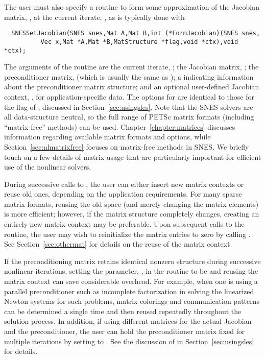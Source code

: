 The user must also specify a routine to form some approximation of the
Jacobian matrix, , at the current iterate, ,
as is typically done with
\begin{verbatim}
  SNESSetJacobian(SNES snes,Mat A,Mat B,int (*FormJacobian)(SNES snes,
          Vec x,Mat *A,Mat *B,MatStructure *flag,void *ctx),void *ctx);
\end{verbatim}
The  arguments of the routine  are the current iterate, ; the Jacobian matrix,
; the preconditioner matrix,  (which is usually the same
as ); a  indicating information about the
preconditioner matrix structure; and an optional user-defined Jacobian
context, , for application-specific data.  The options for
 are identical to those for the flag of , discussed in Section~\ref{sec:usingsles}.  
Note that the SNES solvers are all data-structure neutral, so the full
range of PETSc matrix formats (including ``matrix-free''
methods) can be used.  Chapter~\ref{chapter:matrices} discusses
information regarding available matrix formats and options, while
Section~\ref{sec:nlmatrixfree} focuses on matrix-free
methods in SNES. We briefly touch on a few details of matrix usage that are
particularly important for efficient use of the nonlinear solvers.

During successive calls to , the user can either
insert new matrix contexts or reuse old ones, depending on the
application requirements. For many sparse matrix formats, reusing the
old space (and merely changing the matrix elements) is more efficient;
however, if the matrix structure completely changes, creating an
entirely new matrix context may be preferable.  
Upon subsequent calls to the 
 routine, the user may wish to reinitialize the matrix
entries to zero by calling .  See
Section~\ref{sec:othermat} for details on the reuse of the matrix
context.

If the preconditioning matrix retains identical nonzero structure
during successive nonlinear iterations, setting the parameter, ,
in the  routine to be  
 and reusing the matrix context can save
considerable overhead.  For example, when one is using a parallel
preconditioner such as incomplete factorization in solving the
linearized Newton systems for such problems, matrix colorings and
communication patterns can be determined a single time and then reused
repeatedly throughout the solution process.  In addition, if using
different matrices for the actual Jacobian and the preconditioner, the
user can hold the preconditioner matrix fixed for multiple iterations
by setting  to .  See the
discussion of  in Section~\ref{sec:usingsles} for
details.


